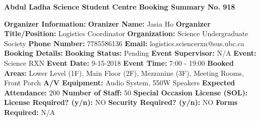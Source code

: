 \documentclass{article}%
\begin{document}
%
\begin{center}%
\textbf{Abdul Ladha Science Student Centre Booking Summary No. 918}%
\end{center}%
\textbf{ }%
\newline%
\textbf{Organizer Information:}%
\newline%
\textbf{Oranizer Name: }%
Jasia Ho%
\newline%
\textbf{Organizer Title/Position: }%
Logistics Coordinator%
\newline%
\textbf{Organization: }%
Science Undergraduate Society%
\newline%
\textbf{Phone Number: }%
7785586136%
\newline%
\textbf{Email: }%
logistics.sciencerxn@sus.ubc.ca%
\newline%
\newline%
\textbf{Booking Details: }%
\newline%
\textbf{Booking Status: }%
Pending%
\newline%
\textbf{Event Supervisor: }%
N/A%
\newline%
\textbf{Event: }%
Science RXN%
\newline%
\textbf{Event Date: }%
9{-}15{-}2018%
\newline%
\textbf{Event Time: }%
7:00 {-} 19:00%
\newline%
\textbf{Booked Areas: }%
Lower Level (1F), Main Floor (2F), Mezzanine (3F), Meeting Rooms, Front Porch%
\newline%
\textbf{A/V Equipment: }%
Audio System, 550W Speakers%
\newline%
\textbf{Expected Attendance: }%
200%
\newline%
\textbf{Number of Staff: }%
50%
\newline%
\newline%
\textbf{Special Occasion License (SOL): }%
\newline%
\textbf{License Required? (y/n): }%
NO%
\newline%
\textbf{Security Required? (y/n): }%
NO%
\newline%
\textbf{Forms Required: }%
N/A%
\newline%
\end{document}
